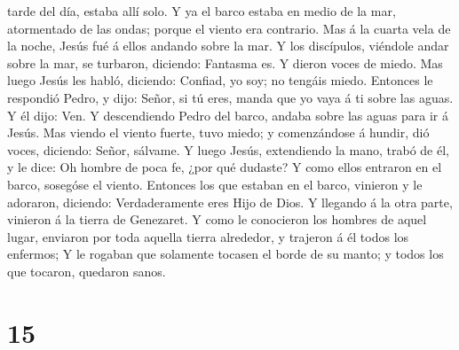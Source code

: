 tarde del día, estaba allí solo.  Y ya el barco estaba en
medio de la mar, atormentado de las ondas; porque el viento era
contrario.  Mas á la cuarta vela de la noche, Jesús fué á
ellos andando sobre la mar.  Y los discípulos, viéndole
andar sobre la mar, se turbaron, diciendo: Fantasma es. Y dieron voces
de miedo.  Mas luego Jesús les habló, diciendo: Confiad,
yo soy; no tengáis miedo.  Entonces le respondió Pedro, y
dijo: Señor, si tú eres, manda que yo vaya á ti sobre las aguas.
 Y él dijo: Ven. Y descendiendo Pedro del barco, andaba
sobre las aguas para ir á Jesús.  Mas viendo el viento
fuerte, tuvo miedo; y comenzándose á hundir, dió voces, diciendo: Señor,
sálvame.  Y luego Jesús, extendiendo la mano, trabó de
él, y le dice: Oh hombre de poca fe, ¿por qué dudaste?  Y
como ellos entraron en el barco, sosegóse el viento. 
Entonces los que estaban en el barco, vinieron y le adoraron, diciendo:
Verdaderamente eres Hijo de Dios.  Y llegando á la otra
parte, vinieron á la tierra de Genezaret.  Y como le
conocieron los hombres de aquel lugar, enviaron por toda aquella tierra
alrededor, y trajeron á él todos los enfermos;  Y le
rogaban que solamente tocasen el borde de su manto; y todos los que
tocaron, quedaron sanos.

\hypertarget{section-14}{%
\section{15}\label{section-14}}

